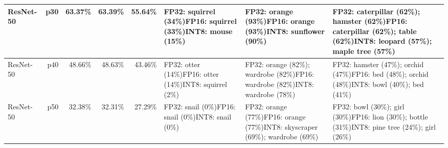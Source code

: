 \begin{longtable}{p{2.8cm} r r r r p{5.0cm} p{4.2cm} p{4.2cm}}
ResNet-50 & p30 & 63.37\% & 63.39\% & 55.64\% & FP32: squirrel (34\%)\newline FP16: squirrel (33\%)\newline INT8: mouse (15\%) & FP32: orange (93\%)\newline FP16: orange (93\%)\newline INT8: sunflower (90\%) & FP32: caterpillar (62\%); hamster (62\%)\newline FP16: caterpillar (62\%); table (62\%)\newline INT8: leopard (57\%); maple tree (57\%) \\ \hline
ResNet-50 & p40 & 48.66\% & 48.63\% & 43.46\% & FP32: otter (14\%)\newline FP16: otter (14\%)\newline INT8: squirrel (2\%) & FP32: orange (82\%); wardrobe (82\%)\newline FP16: wardrobe (82\%)\newline INT8: wardrobe (78\%) & FP32: hamster (47\%); orchid (47\%)\newline FP16: bed (48\%); orchid (48\%)\newline INT8: bowl (40\%); bed (41\%) \\ \hline
ResNet-50 & p50 & 32.38\% & 32.31\% & 27.29\% & FP32: snail (0\%)\newline FP16: snail (0\%)\newline INT8: snail (0\%) & FP32: orange (77\%)\newline FP16: orange (77\%)\newline INT8: skyscraper (69\%); wardrobe (69\%) & FP32: bowl (30\%); girl (30\%)\newline FP16: lion (30\%); bottle (31\%)\newline INT8: pine tree (24\%); girl (26\%) \\ \hline

\end{longtable}
